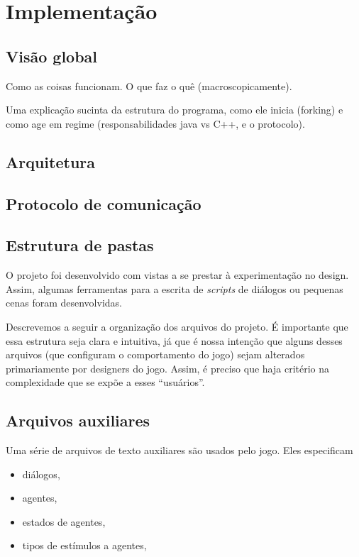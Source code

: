 \chapter{Implementação}

\section{Visão global}

Como as coisas funcionam. O que faz o quê (macroscopicamente).

Uma explicação sucinta da estrutura do programa, como ele inicia
(forking) e como age em regime (responsabilidades java vs C++, e o
protocolo).

\section{Arquitetura}

\section{Protocolo de comunicação}

\section{Estrutura de pastas}

O projeto foi desenvolvido com vistas a se prestar à experimentação no
design. Assim, algumas ferramentas para a escrita de \emph{scripts} de
diálogos ou pequenas cenas foram desenvolvidas. 

Descrevemos a seguir a organização dos arquivos do projeto. É
importante que essa estrutura seja clara e intuitiva, já que é nossa
intenção que alguns desses arquivos (que configuram o comportamento
do jogo) sejam alterados primariamente por designers do jogo. Assim, é
preciso que haja critério na complexidade que se expõe a esses
``usuários''.


\section{Arquivos auxiliares}

Uma série de arquivos de texto auxiliares são usados pelo
jogo. Eles especificam
\begin{itemize}
\item diálogos,
\item agentes,
\item estados de agentes,
\item tipos de estímulos a agentes,
\end{itemize}

